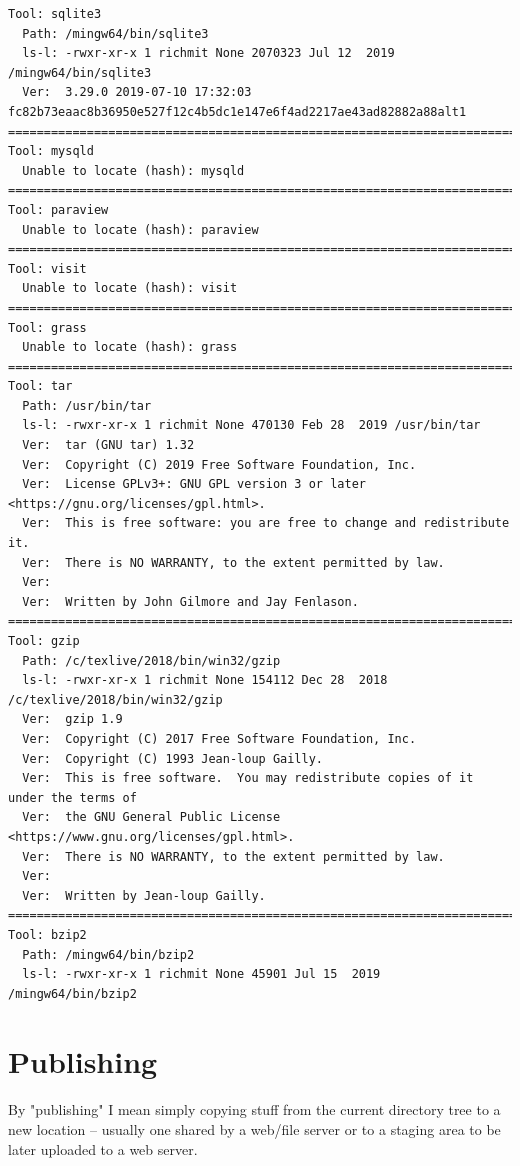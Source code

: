\documentclass[11pt]{article}
\begin{document}
\begin{verbatim}
Tool: sqlite3
  Path: /mingw64/bin/sqlite3
  ls-l: -rwxr-xr-x 1 richmit None 2070323 Jul 12  2019 /mingw64/bin/sqlite3
  Ver:  3.29.0 2019-07-10 17:32:03 fc82b73eaac8b36950e527f12c4b5dc1e147e6f4ad2217ae43ad82882a88alt1
==========================================================================================
Tool: mysqld
  Unable to locate (hash): mysqld
==========================================================================================
Tool: paraview
  Unable to locate (hash): paraview
==========================================================================================
Tool: visit
  Unable to locate (hash): visit
==========================================================================================
Tool: grass
  Unable to locate (hash): grass
==========================================================================================
Tool: tar
  Path: /usr/bin/tar
  ls-l: -rwxr-xr-x 1 richmit None 470130 Feb 28  2019 /usr/bin/tar
  Ver:  tar (GNU tar) 1.32
  Ver:  Copyright (C) 2019 Free Software Foundation, Inc.
  Ver:  License GPLv3+: GNU GPL version 3 or later <https://gnu.org/licenses/gpl.html>.
  Ver:  This is free software: you are free to change and redistribute it.
  Ver:  There is NO WARRANTY, to the extent permitted by law.
  Ver:  
  Ver:  Written by John Gilmore and Jay Fenlason.
==========================================================================================
Tool: gzip
  Path: /c/texlive/2018/bin/win32/gzip
  ls-l: -rwxr-xr-x 1 richmit None 154112 Dec 28  2018 /c/texlive/2018/bin/win32/gzip
  Ver:  gzip 1.9
  Ver:  Copyright (C) 2017 Free Software Foundation, Inc.
  Ver:  Copyright (C) 1993 Jean-loup Gailly.
  Ver:  This is free software.  You may redistribute copies of it under the terms of
  Ver:  the GNU General Public License <https://www.gnu.org/licenses/gpl.html>.
  Ver:  There is NO WARRANTY, to the extent permitted by law.
  Ver:  
  Ver:  Written by Jean-loup Gailly.
==========================================================================================
Tool: bzip2
  Path: /mingw64/bin/bzip2
  ls-l: -rwxr-xr-x 1 richmit None 45901 Jul 15  2019 /mingw64/bin/bzip2
\end{verbatim}

\section{Publishing}
\label{sec:org80d370b}
By "publishing" I mean simply copying stuff from the current directory tree to a new location -- usually one shared by a web/file server or to a staging area
to be later uploaded to a web server.
\end{document}
